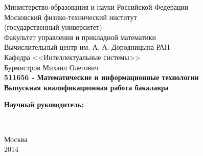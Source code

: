 {
	\renewcommand{\baselinestretch}{1}
	\thispagestyle{empty}
	\begin{center}
		\sc
			Министерство образования и науки Российской Федерации\\
			Московский физико-технический институт\\
			{\rm(государственный университет)}\\
			Факультет управления и прикладной математики\\
			Вычислительный центр им. А. А. Дородницына РАН\\
			Кафедра <<Интеллектуальные системы>>\\[40mm]
		\rm\large
			Бурмистров Михаил Олегович\\[15mm] 
		\bf\Large
		\rm\normalsize
			{511656 - Математические и информационные технологии}\\[5mm]
		\sc
		Выпускная квалификационная работа бакалавра\vspace{40mm}
	\end{center}
	\hfill \parbox{90mm} { 
		\begin{flushleft}
			\bf Научный руководитель:\\
		\end{flushleft}
	}
	\\ \vspace{3cm}
	\begin{center}
		Москва\\
		2014
	\end{center}
}